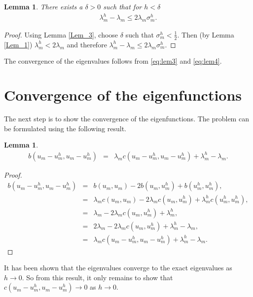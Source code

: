 \documentclass[../../main.tex]{subfiles}
\begin{document}
\newtheorem{Lem_4}[Lem_1]{Lemma} 
\begin{Lem_4}
	\label{Lem_4}
	There exists a $\delta > 0$ such that for $h < \delta$
	\begin{eqnarray}
	\lambda_{m}^{h} - \lambda_{m} \leq 2\lambda_{m}\sigma_{m}^{h}. \label{eq:lem4}
	\end{eqnarray}
\end{Lem_4}
\begin{proof}
	Using Lemma \ref{Lem_3}, choose $\delta$ such that $\sigma_{m}^{h} < \frac{1}{2}$. Then (by Lemma \ref{Lem_1}) $\lambda_{m}^{h} < 2\lambda_{m}$ and therefore $\lambda_{m}^{h} - \lambda_{m} \leq 2\lambda_{m}\sigma_{m}^{h}$.
\end{proof}

The convergence of the eigenvalues follows from \eqref{eq:lem3} and \eqref{eq:lem4}.

\section{Convergence of the eigenfunctions}
The next step is to show the convergence of the eigenfunctions. The problem can be formulated using the following result.

\newtheorem{Lem_5}[Lem_1]{Lemma} 
\begin{Lem_5}
	\label{Lem_5}
	\begin{eqnarray*}
		b(u_{m}-u_{m}^{h},u_{m}-u_{m}^{h}) &=& \lambda_{m}c( u_{m}-u_{m}^{h},u_{m}-u_{m}^{h} ) + \lambda_{m}^{h} - \lambda_{m}.
		\end{eqnarray*}
\end{Lem_5}
\begin{proof}
	\begin{eqnarray*}
		b(u_{m}-u_{m}^{h},u_{m}-u_{m}^{h}) &=& b(u_{m},u_{m}) - 2b(u_{m},u^{h}_{m}) + b(u^{h}_{m},u^{h}_{m}), \\
										&=& \lambda_{m} c( u_{m}, u_{m} ) - 2\lambda_{m} c( u_{m}, u^{h}_{m} ) + \lambda_{m}^{h}c( u_{m}^{h},u_{m}^{h} ),\\
										&=&  \lambda_{m} - 2\lambda_{m} c( u_{m}, u^{h}_{m} ) + \lambda_{m}^{h}, \\
										&=& 2\lambda_{m} - 2\lambda_{m} c( u_{m}, u^{h}_{m} ) + \lambda_{m}^{h} - \lambda_{m},\\
										&=& \lambda_{m}c( u_{m}-u_{m}^{h},u_{m}-u_{m}^{h}) + \lambda_{m}^{h} - \lambda_{m}.
		\end{eqnarray*}
\end{proof}

It has been shown that the eigenvalues converge to the exact eigenvalues as $h \rightarrow 0$. So from this result, it only remains to show that $c( u_{m}-u_{m}^{h},u_{m}-u_{m}^{h}) \rightarrow 0$ as $h \rightarrow 0$.
\end{document}
